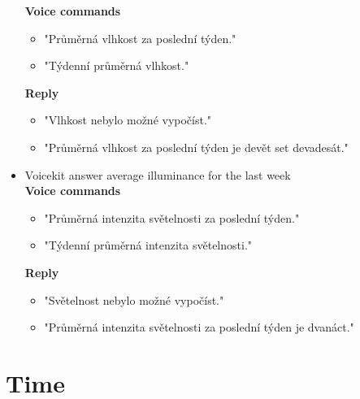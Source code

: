 \begin{itemize}
    \textbf{Voice commands}
    \begin{itemize}
        \item "Průměrná vlhkost za poslední týden."
        \item "Týdenní průměrná vlhkost."
    \end{itemize}
    \textbf{Reply}
    \begin{itemize}
        \item "Vlhkost nebylo možné vypočíst."
        \item "Průměrná vlhkost za poslední týden je devět set devadesát."
    \end{itemize}
    \item Voicekit answer average illuminance for the last week\\
    \textbf{Voice commands}
    \begin{itemize}
        \item "Průměrná intenzita světelnosti za poslední týden."
        \item "Týdenní průměrná intenzita světelnosti."
    \end{itemize}
    \textbf{Reply}
    \begin{itemize}
        \item "Světelnost nebylo možné vypočíst."
        \item "Průměrná intenzita světelnosti za poslední týden je dvanáct."
    \end{itemize}
\end{itemize}

\section{Time}\label{section:app_time}

